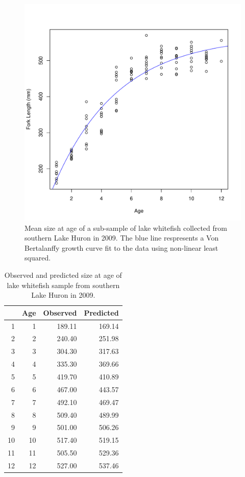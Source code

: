 \documentclass{article}\usepackage[]{graphicx}\usepackage[]{color}
\begin{document}
\begin{figure}
  \begin{center} 
     \includegraphics[width=\textwidth]{plot_fit} 
  \end{center} 
  \caption{Mean size at age of a sub-sample of lake whitefish
    collected from southern Lake Huron in 2009.  The blue line
    respresents a Von Bertalanffy growth curve fit to the data using
    non-linear least squared.}
  \label{fig:plot_fit}
\end{figure}


\begin{table}[ht]
\centering
\begin{tabular}{rrrr}
  \hline
 & Age & Observed & Predicted \\ 
  \hline
1 &   1 & 189.11 & 169.14 \\ 
  2 &   2 & 240.40 & 251.98 \\ 
  3 &   3 & 304.30 & 317.63 \\ 
  4 &   4 & 335.30 & 369.66 \\ 
  5 &   5 & 419.70 & 410.89 \\ 
  6 &   6 & 467.00 & 443.57 \\ 
  7 &   7 & 492.10 & 469.47 \\ 
  8 &   8 & 509.40 & 489.99 \\ 
  9 &   9 & 501.00 & 506.26 \\ 
  10 &  10 & 517.40 & 519.15 \\ 
  11 &  11 & 505.50 & 529.36 \\ 
  12 &  12 & 527.00 & 537.46 \\ 
   \hline
\end{tabular}
\caption{Observed and predicted size at age of lake whitefish sample from southern Lake Huron in 2009.} 
\label{tbl:size-at-age}
\end{table}
\end{document}
